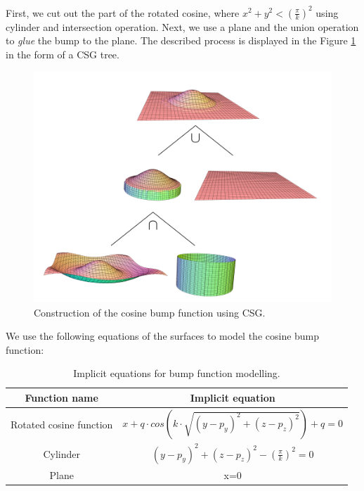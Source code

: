 First, we cut out the part of the rotated cosine, where
$x^2+y^2<(\frac{\pi}{k})^2$ using cylinder and intersection operation. Next,
we use a plane and the union operation to \textit{glue} the bump to the plane.
The described process is displayed in the Figure \ref{img:24} in the form of a CSG tree.
\begin{figure}
    \centerline{\includegraphics[scale=0.5]{images/img24}}
    \caption[Construction of the cosine bump function using CSG]
    {Construction of the cosine bump function using CSG.}
    \label{img:24}
\end{figure}
We use the following equations of the surfaces to model the cosine bump function:

\begin{table}[]
    \centering
    \begin{tabular}{|c|c|}
        \hline\hline
    Function name            & Implicit equation                                        \\ \hline\hline
    Rotated cosine function & $x+q \cdot cos(k \cdot \sqrt{(y-p_y)^2+(z-p_z)^2})+q=0$  \\ \hline
    Cylinder                & $(y-p_y)^2+(z-p_z)^2-(\frac{\pi}{k})^2=0$                \\ \hline
    Plane                   & x=0                                                      \\ \hline\hline
    \end{tabular}
    \caption[Implicit equations for bump function modelling]
    {Implicit equations for bump function modelling.}
    \label{tab:1}
    \end{table}

